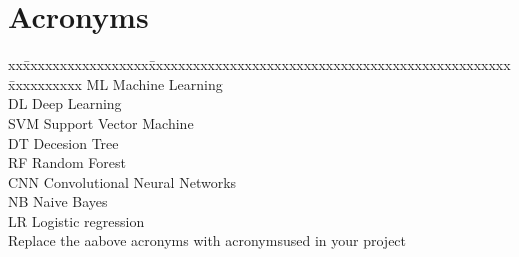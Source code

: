 \begin{flushright}
	
\end{flushright}\chapter*{Acronyms}
\begin{tabbing}
	xx\=xxxxxxxxxxxxxxxxx\=xxxxxxxxxxxxxxxxxxxxxxxxxxxxxxxxxxxxxxxxxxxxxxxxx\=xxxxxxxxxx\kill
	\>ML  \>  Machine Learning\\
	\>DL  \>  Deep Learning\\
	\>SVM  \>  Support Vector Machine\\
	\>DT  \>  Decesion Tree\\
	\>RF  \>  Random Forest\\	
	 \>CNN  \> Convolutional Neural Networks\\
	 \>NB  \> Naive Bayes\\
	 \>LR  \> Logistic regression\\
	 
	  Replace the aabove acronyms with acronymsused in your project
	 	
\end{tabbing}
